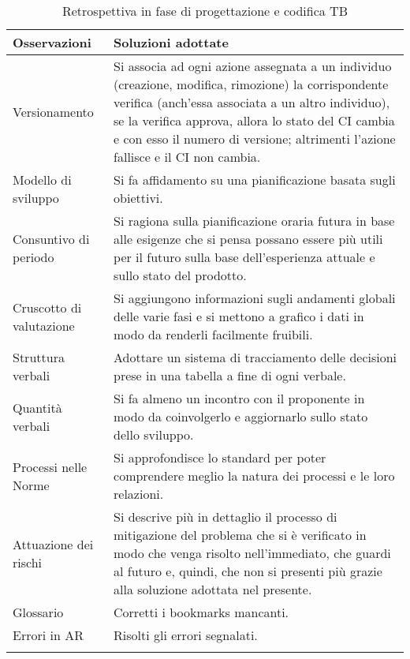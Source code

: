 \begin{center}
	\begin{longtable}{|p{4cm}|p{11cm}|}
		\hline
		\rowcolor{lightgray}
		\textbf{Osservazioni} & \textbf{Soluzioni adottate} \\
		\hline

		Versionamento & Si associa ad ogni azione assegnata a un individuo (creazione, modifica, rimozione) la corrispondente verifica (anch'essa associata a un altro individuo), se la verifica approva, allora lo stato del CI cambia e con esso il numero di versione; altrimenti l'azione fallisce e il CI non cambia. \\
		Modello di sviluppo & Si fa affidamento su una pianificazione basata sugli obiettivi. \\
		Consuntivo di periodo & Si ragiona sulla pianificazione oraria futura in base alle esigenze che si pensa possano essere più utili per il futuro sulla base dell'esperienza attuale e sullo stato del prodotto. \\
		Cruscotto di valutazione & Si aggiungono informazioni sugli andamenti globali delle varie fasi e si mettono a grafico i dati in modo da renderli facilmente fruibili. \\
		Struttura verbali & Adottare un sistema di tracciamento delle decisioni prese in una tabella a fine di ogni verbale. \\
		Quantità verbali & Si fa almeno un incontro con il proponente in modo da coinvolgerlo e aggiornarlo sullo stato dello sviluppo. \\
		Processi nelle Norme & Si approfondisce lo standard \glossario{ISO/IEC 12207} per poter comprendere meglio la natura dei processi e le loro relazioni. \\
		Attuazione dei rischi & Si descrive più in dettaglio il processo di mitigazione del problema che si è verificato in modo che venga risolto nell'immediato, che guardi al futuro e, quindi, che non si presenti più grazie alla soluzione adottata nel presente. \\
		Glossario & Corretti i bookmarks mancanti. \\
		Errori in AR & Risolti gli errori segnalati. \\

		\hline
		\rowcolor{white}
		\caption{Retrospettiva in fase di progettazione e codifica TB}
	\end{longtable}
\end{center}

